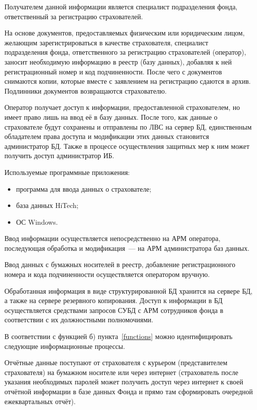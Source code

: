 Получателем данной информации является специалист подразделения фонда, ответственный за регистрацию страхователей.

\point На основе документов, предоставляемых физическим или юридическим лицом, желающим зарегистрироваться в качестве страхователя, специалист подразделения фонда, ответственного за регистрацию страхователей (оператор), заносит необходимую информацию в реестр (базу данных), добавляя к ней регистрационный номер и код подчиненности. После чего с документов снимаются копии, которые вместе с заявлением на регистрацию сдаются в архив. Подлинники документов возвращаются страхователю.

\point Оператор получает доступ к информации, предоставленной страхователем, но имеет право лишь на ввод её в базу данных. После того, как данные о страхователе будут сохранены и отправлены по ЛВС на сервер БД, единственным обладателем права доступа и модификации этих данных становится администратор БД. Также в процессе осуществления защитных мер к ним может получить доступ администратор ИБ.

\point Используемые программные приложения:

\begin{itemize}
\item программа для ввода данных о страхователе;
\item база данных HiTech;
\item ОС Windows.
\end{itemize}

\point Ввод информации осуществляется непосредственно на АРМ оператора, последующая обработка и модификация~--- на АРМ администратора баз данных.

Ввод данных с бумажных носителей в реестр, добавление регистрационного номера и кода подчиненности осуществляется оператором вручную.

\point Обработанная информация в виде структурированной БД хранится на сервере БД, а также на сервере резервного копирования. Доступ к информации в БД осуществляется средствами запросов СУБД с АРМ сотрудников фонда в соответствии с их должностными полномочиями.

В соответствии с функцией б) пункта~\ref{functions} можно идентифицировать следующие информационные процессы.

\point Отчётные данные поступают от страхователя с курьером (представителем страхователя) на бумажном носителе или через интернет (страхователь после указания необходимых паролей может получить доступ через интернет к своей отчётной информации в базе данных Фонда и прямо там сформировать очередной ежеквартальных отчёт).

